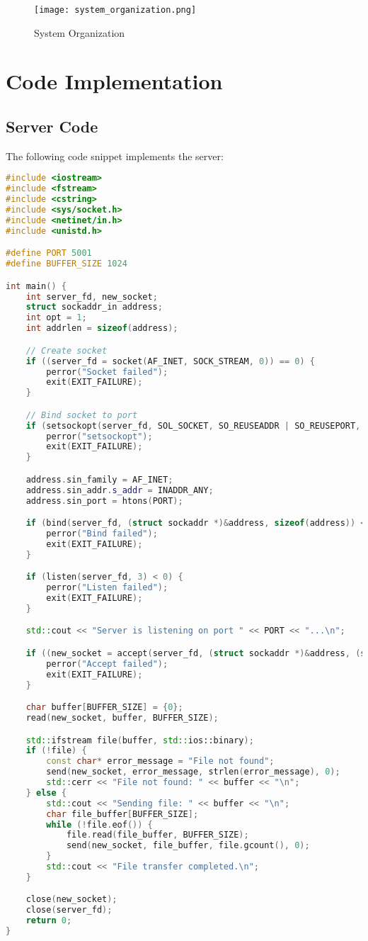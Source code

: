 \documentclass[a4paper,12pt]{article}
\begin{document}
\begin{figure}[h!]
    \centering
    \texttt{[image: system\_organization.png]}
    \caption{System Organization}
    \label{fig:organization}
\end{figure}

\section{Code Implementation}

\subsection{Server Code}
The following code snippet implements the server:
\begin{lstlisting}[language=C++,caption=Server Code]
#include <iostream>
#include <fstream>
#include <cstring>
#include <sys/socket.h>
#include <netinet/in.h>
#include <unistd.h>

#define PORT 5001
#define BUFFER_SIZE 1024

int main() {
    int server_fd, new_socket;
    struct sockaddr_in address;
    int opt = 1;
    int addrlen = sizeof(address);

    // Create socket
    if ((server_fd = socket(AF_INET, SOCK_STREAM, 0)) == 0) {
        perror("Socket failed");
        exit(EXIT_FAILURE);
    }

    // Bind socket to port
    if (setsockopt(server_fd, SOL_SOCKET, SO_REUSEADDR | SO_REUSEPORT, &opt, sizeof(opt))) {
        perror("setsockopt");
        exit(EXIT_FAILURE);
    }

    address.sin_family = AF_INET;
    address.sin_addr.s_addr = INADDR_ANY;
    address.sin_port = htons(PORT);

    if (bind(server_fd, (struct sockaddr *)&address, sizeof(address)) < 0) {
        perror("Bind failed");
        exit(EXIT_FAILURE);
    }

    if (listen(server_fd, 3) < 0) {
        perror("Listen failed");
        exit(EXIT_FAILURE);
    }

    std::cout << "Server is listening on port " << PORT << "...\n";

    if ((new_socket = accept(server_fd, (struct sockaddr *)&address, (socklen_t*)&addrlen)) < 0) {
        perror("Accept failed");
        exit(EXIT_FAILURE);
    }

    char buffer[BUFFER_SIZE] = {0};
    read(new_socket, buffer, BUFFER_SIZE);

    std::ifstream file(buffer, std::ios::binary);
    if (!file) {
        const char* error_message = "File not found";
        send(new_socket, error_message, strlen(error_message), 0);
        std::cerr << "File not found: " << buffer << "\n";
    } else {
        std::cout << "Sending file: " << buffer << "\n";
        char file_buffer[BUFFER_SIZE];
        while (!file.eof()) {
            file.read(file_buffer, BUFFER_SIZE);
            send(new_socket, file_buffer, file.gcount(), 0);
        }
        std::cout << "File transfer completed.\n";
    }

    close(new_socket);
    close(server_fd);
    return 0;
}
\end{lstlisting}
\end{document}

